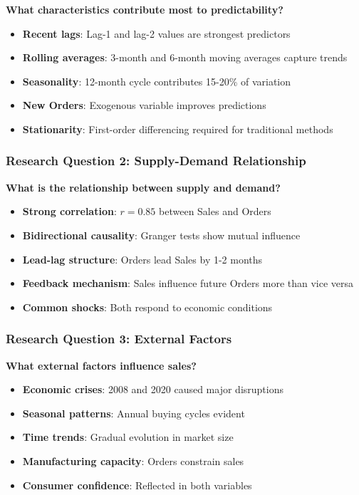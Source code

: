 \documentclass[12pt]{article}
\begin{document}
\textbf{What characteristics contribute most to predictability?}

\begin{itemize}
    \item \textbf{Recent lags}: Lag-1 and lag-2 values are strongest predictors
    \item \textbf{Rolling averages}: 3-month and 6-month moving averages capture trends
    \item \textbf{Seasonality}: 12-month cycle contributes 15-20\% of variation
    \item \textbf{New Orders}: Exogenous variable improves predictions
    \item \textbf{Stationarity}: First-order differencing required for traditional methods
\end{itemize}

\subsubsection*{Research Question 2: Supply-Demand Relationship}

\textbf{What is the relationship between supply and demand?}

\begin{itemize}
    \item \textbf{Strong correlation}: $r = 0.85$ between Sales and Orders
    \item \textbf{Bidirectional causality}: Granger tests show mutual influence
    \item \textbf{Lead-lag structure}: Orders lead Sales by 1-2 months
    \item \textbf{Feedback mechanism}: Sales influence future Orders more than vice versa
    \item \textbf{Common shocks}: Both respond to economic conditions
\end{itemize}

\subsubsection*{Research Question 3: External Factors}

\textbf{What external factors influence sales?}

\begin{itemize}
    \item \textbf{Economic crises}: 2008 and 2020 caused major disruptions
    \item \textbf{Seasonal patterns}: Annual buying cycles evident
    \item \textbf{Time trends}: Gradual evolution in market size
    \item \textbf{Manufacturing capacity}: Orders constrain sales
    \item \textbf{Consumer confidence}: Reflected in both variables
\end{itemize}
\end{document}
